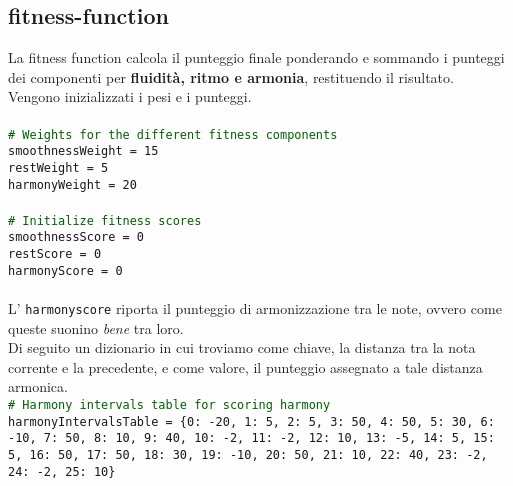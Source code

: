 \documentclass[a4paper,12pt]{report}
\begin{document}
\subsection{fitness-function}

La fitness function calcola il punteggio finale ponderando e sommando i punteggi dei componenti per \textbf{fluidità, ritmo e armonia}, restituendo il risultato. \\
Vengono inizializzati i pesi e i punteggi. \\
\\
\texttt{\small\textcolor{darkgreen}{\# Weights for the different fitness components}} \\
    \texttt{\small smoothnessWeight = 15} \\
    \texttt{\small restWeight = 5} \\
    \texttt{\small harmonyWeight = 20} \\
\\
\texttt{\small\textcolor{darkgreen}{\# Initialize fitness scores}} \\
    \texttt{\small smoothnessScore = 0} \\
    \texttt{\small restScore = 0} \\
    \texttt{\small harmonyScore = 0} \\
\\
L' \texttt{harmonyscore} riporta il punteggio di armonizzazione tra le note, ovvero come queste suonino \textit{bene} tra loro. \\
Di seguito un dizionario in cui troviamo come chiave, la distanza tra la nota corrente e la precedente, e come valore, il punteggio assegnato a tale distanza armonica. \\

\texttt{\small\textcolor{darkgreen}{\# Harmony intervals table for scoring harmony}} \\
\texttt{\small harmonyIntervalsTable = \{0: -20, 1: 5, 2: 5, 3: 50, 4: 50, 5: 30, 6: -10, 7: 50, 8: 10, 9: 40, 10: -2, 11: -2, 12: 10, 13: -5, 14: 5, 15: 5, 16: 50, 17: 50, 18: 30, 19: -10, 20: 50, 21: 10, 22: 40, 23: -2, 24: -2, 25: 10\}} \\
\end{document}
